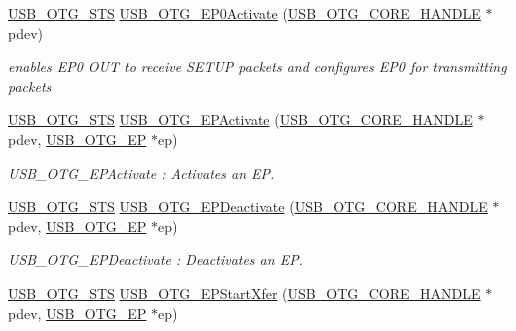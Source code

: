 \begin{DoxyCompactItemize}
\hyperlink{group___u_s_b___c_o_r_e___exported___types_ga8b6504b9af0662f17515795db0f9c8ed}{U\-S\-B\-\_\-\-O\-T\-G\-\_\-\-S\-T\-S} \hyperlink{group___u_s_b___c_o_r_e___private___functions_ga0fabcd7b811a835080871cb9cc18fd5a}{U\-S\-B\-\_\-\-O\-T\-G\-\_\-\-E\-P0\-Activate} (\hyperlink{group___u_s_b___c_o_r_e___exported___types_gaf76054c11eb8a3367907aad7ae700e80}{U\-S\-B\-\_\-\-O\-T\-G\-\_\-\-C\-O\-R\-E\-\_\-\-H\-A\-N\-D\-L\-E} $\ast$pdev)
\begin{DoxyCompactList}\small\item\em enables E\-P0 O\-U\-T to receive S\-E\-T\-U\-P packets and configures E\-P0 for transmitting packets \end{DoxyCompactList}\item 
\hyperlink{group___u_s_b___c_o_r_e___exported___types_ga8b6504b9af0662f17515795db0f9c8ed}{U\-S\-B\-\_\-\-O\-T\-G\-\_\-\-S\-T\-S} \hyperlink{group___u_s_b___c_o_r_e___private___functions_ga3506fb02d0b74d2d42be8ddc67f1fddf}{U\-S\-B\-\_\-\-O\-T\-G\-\_\-\-E\-P\-Activate} (\hyperlink{group___u_s_b___c_o_r_e___exported___types_gaf76054c11eb8a3367907aad7ae700e80}{U\-S\-B\-\_\-\-O\-T\-G\-\_\-\-C\-O\-R\-E\-\_\-\-H\-A\-N\-D\-L\-E} $\ast$pdev, \hyperlink{group___u_s_b___c_o_r_e___exported___types_gad1c65925021e8dac88858e10bb2a7eea}{U\-S\-B\-\_\-\-O\-T\-G\-\_\-\-E\-P} $\ast$ep)
\begin{DoxyCompactList}\small\item\em U\-S\-B\-\_\-\-O\-T\-G\-\_\-\-E\-P\-Activate \-: Activates an E\-P. \end{DoxyCompactList}\item 
\hyperlink{group___u_s_b___c_o_r_e___exported___types_ga8b6504b9af0662f17515795db0f9c8ed}{U\-S\-B\-\_\-\-O\-T\-G\-\_\-\-S\-T\-S} \hyperlink{group___u_s_b___c_o_r_e___private___functions_gad8d304905c8dba28a3363c83024db018}{U\-S\-B\-\_\-\-O\-T\-G\-\_\-\-E\-P\-Deactivate} (\hyperlink{group___u_s_b___c_o_r_e___exported___types_gaf76054c11eb8a3367907aad7ae700e80}{U\-S\-B\-\_\-\-O\-T\-G\-\_\-\-C\-O\-R\-E\-\_\-\-H\-A\-N\-D\-L\-E} $\ast$pdev, \hyperlink{group___u_s_b___c_o_r_e___exported___types_gad1c65925021e8dac88858e10bb2a7eea}{U\-S\-B\-\_\-\-O\-T\-G\-\_\-\-E\-P} $\ast$ep)
\begin{DoxyCompactList}\small\item\em U\-S\-B\-\_\-\-O\-T\-G\-\_\-\-E\-P\-Deactivate \-: Deactivates an E\-P. \end{DoxyCompactList}\item 
\hyperlink{group___u_s_b___c_o_r_e___exported___types_ga8b6504b9af0662f17515795db0f9c8ed}{U\-S\-B\-\_\-\-O\-T\-G\-\_\-\-S\-T\-S} \hyperlink{group___u_s_b___c_o_r_e___private___functions_gab401b82677e559a8cfe12c30539e66ca}{U\-S\-B\-\_\-\-O\-T\-G\-\_\-\-E\-P\-Start\-Xfer} (\hyperlink{group___u_s_b___c_o_r_e___exported___types_gaf76054c11eb8a3367907aad7ae700e80}{U\-S\-B\-\_\-\-O\-T\-G\-\_\-\-C\-O\-R\-E\-\_\-\-H\-A\-N\-D\-L\-E} $\ast$pdev, \hyperlink{group___u_s_b___c_o_r_e___exported___types_gad1c65925021e8dac88858e10bb2a7eea}{U\-S\-B\-\_\-\-O\-T\-G\-\_\-\-E\-P} $\ast$ep)

\end{DoxyCompactItemize}
